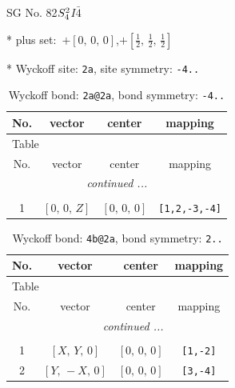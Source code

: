 \documentclass[fleqn,8pt]{jsarticle}
\begin{document}
\setcounter{MaxMatrixCols}{32}

\renewcommand{\tablename}{Table~}
\renewcommand{\figurename}{Figure~}
\begin{center}
\LARGE
SG No. 82\quad$S_{\rm 4}^{2}$\quad$I\bar{4}$\quad[ tetragonal ]
\end{center}

* plus set:\,\,\,$+\left[ 0,\, 0,\, 0 \right]$,\quad $+\left[ \frac{1}{2},\, \frac{1}{2},\, \frac{1}{2} \right]$


* Wyckoff site: {\tt 2a}, site symmetry: {\tt -4..}
\renewcommand{\arraystretch}{1.2}
\begin{longtable}{cccc}
\caption{Wyckoff bond: {\tt 2a@2a}, bond symmetry: {\tt -4..}}
 \\
 \hline \hline
No. & vector & center & mapping \\ \hline \endfirsthead

\multicolumn{3}{l}{\tablename\ \thetable{}} \\
 \hline \hline
No. & vector & center & mapping \\ \hline \endhead

 \hline \hline
\multicolumn{3}{r}{\footnotesize\it continued ...} \\ \endfoot

 \hline \hline
\multicolumn{3}{r}{} \\ \endlastfoot

1 & $\left[ 0,\, 0,\, Z \right]$ & $\left[ 0,\, 0,\, 0 \right]$ & {\tt [1,2,-3,-4]} \\
\end{longtable}
\renewcommand{\arraystretch}{1.2}
\begin{longtable}{cccc}
\caption{Wyckoff bond: {\tt 4b@2a}, bond symmetry: {\tt 2..}}
 \\
 \hline \hline
No. & vector & center & mapping \\ \hline \endfirsthead

\multicolumn{3}{l}{\tablename\ \thetable{}} \\
 \hline \hline
No. & vector & center & mapping \\ \hline \endhead

 \hline \hline
\multicolumn{3}{r}{\footnotesize\it continued ...} \\ \endfoot

 \hline \hline
\multicolumn{3}{r}{} \\ \endlastfoot

1 & $\left[ X,\, Y,\, 0 \right]$ & $\left[ 0,\, 0,\, 0 \right]$ & {\tt [1,-2]} \\ \hline
2 & $\left[ Y,\, - X,\, 0 \right]$ & $\left[ 0,\, 0,\, 0 \right]$ & {\tt [3,-4]} \\
\end{longtable}
\end{document}
